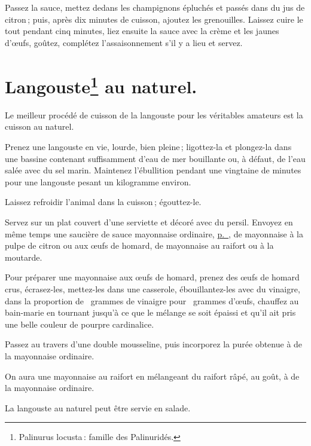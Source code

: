 Passez la sauce, mettez dedans les champignons épluchés et passés dans du jus
de citron ; puis, après dix minutes de cuisson, ajoutez les grenouilles.
Laissez cuire le tout pendant cinq minutes, liez ensuite la sauce avec la crème
et les jaunes d'œufs, goûtez, complétez l’assaisonnement s'il y a lieu et
servez.


\section*{\centering Langouste\footnote{Palinurus locusta : famille des Palinuridés.} au naturel.}

Le meilleur procédé de cuisson de la langouste pour les véritables amateurs est
la cuisson au naturel.

Prenez une langouste en vie, lourde, bien pleine ; ligottez-la et plongez-la dans
une bassine contenant suffisamment d'eau de mer bouillante ou, à défaut, de l'eau
salée avec du sel marin. Maintenez l'ébullition pendant une vingtaine de minutes
pour une langouste pesant un kilogramme environ.

Laissez refroidir l'animal dans la cuisson ; égouttez-le.

Servez sur un plat couvert d'une serviette et décoré avec du persil. Envoyez en
même temps une saucière de sauce mayonnaise ordinaire,
\hyperlink{p0323}{p. \pageref{pg0323}}, de mayonnaise à la pulpe de citron ou
aux œufs de homard, de mayonnaise au raifort ou à la moutarde.

\sk

Pour préparer une mayonnaise aux œufs de homard, prenez des œufs de homard
crus, écrasez-les, mettez-les dans une casserole, ébouillantez-les avec du
vinaigre, dans la proportion de {\mmm} grammes de vinaigre
pour {\mmm} grammes d'œufs, chauffez au bain-marie en tournant jusqu'à ce
que le mélange se soit épaissi et qu'il ait pris une belle couleur de pourpre
cardinalice.

Passez au travers d'une double mousseline, puis incorporez la purée obtenue
à de la mayonnaise ordinaire.

\sk

On aura une mayonnaise au raifort en mélangeant du raifort râpé, au goût, à de
la mayonnaise ordinaire.

\sk

La langouste au naturel peut être servie en salade.

